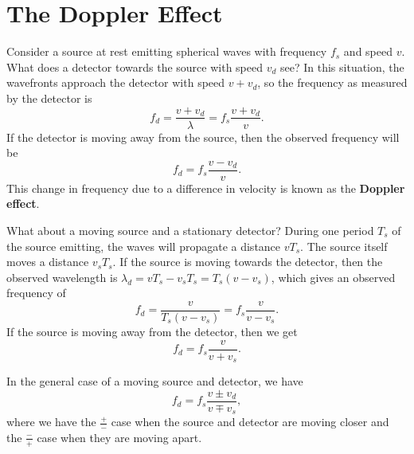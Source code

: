 \documentclass[../classical_mechanics.tex]{subfiles}
\begin{document}
    \section{The Doppler Effect}\label{sec:the-doppler-effect}
        Consider a source at rest emitting spherical waves with frequency $f_s$ and speed $v$.
        What does a detector towards the source with speed $v_d$ see?
        In this situation, the wavefronts approach the detector with speed $v+v_d$, so the frequency as measured by the detector is
        \begin{equation}
            f_d=\frac{v+v_d}{\lambda}=f_s\frac{v+v_d}{v}.
        \end{equation}
        If the detector is moving away from the source, then the observed frequency will be
        \begin{equation}
            f_d=f_s\frac{v-v_d}{v}.
        \end{equation}
        This change in frequency due to a difference in velocity is known as the \textbf{Doppler effect}.

        What about a moving source and a stationary detector?
        During one period $T_s$ of the source emitting, the waves will propagate a distance $vT_s$.
        The source itself moves a distance $v_sT_s$.
        If the source is moving towards the detector, then the observed wavelength is $\lambda_d=vT_s-v_sT_s=T_s(v-v_s)$, which gives an observed frequency of
        \begin{equation}
            f_d=\frac{v}{T_s(v-v_s)}=f_s\frac{v}{v-v_s}.
        \end{equation}
        If the source is moving away from the detector, then we get
        \begin{equation}
            f_d=f_s\frac{v}{v+v_s}.
        \end{equation}

        In the general case of a moving source and detector, we have
        \begin{equation}
            f_d=f_s\frac{v\pm v_d}{v\mp v_s},
        \end{equation}
        where we have the $\frac{+}{-}$ case when the source and detector are moving closer and the $\frac{-}{+}$ case when they are moving apart.
\end{document}
